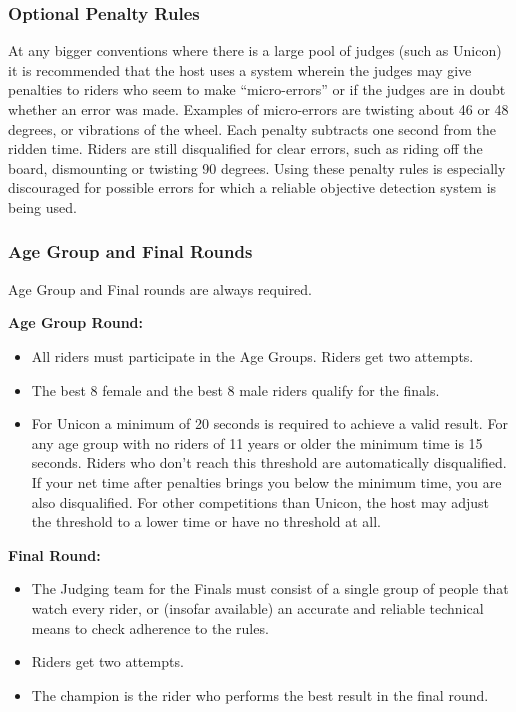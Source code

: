 \subsubsection{Optional Penalty Rules}
At any bigger conventions where there is a large pool of judges (such as Unicon) it is recommended that the host uses a system wherein the judges may give penalties to riders who seem to make ``micro-errors'' or if the judges are in doubt whether an error was made.
Examples of micro-errors are twisting about 46 or 48 degrees, or vibrations of the wheel.
Each penalty subtracts one second from the ridden time.
Riders are still disqualified for clear errors, such as riding off the board, dismounting or twisting 90 degrees.
Using these penalty rules is especially discouraged for possible errors for which a reliable objective detection system is being used.

\subsubsection{Age Group and Final Rounds}
Age Group and Final rounds are always required.

\textbf{Age Group Round:}
\begin{itemize}
\item All riders must participate in the Age Groups.
Riders get two attempts.
\item The best 8 female and the best 8 male riders qualify for the finals.
\item For Unicon a minimum of 20 seconds is required to achieve a valid result.
For any age group with no riders of 11 years or older the minimum time is 15 seconds.
Riders who don't reach this threshold are automatically disqualified.
If your net time after penalties brings you below the minimum time, you are also disqualified.
For other competitions than Unicon, the host may adjust the threshold to a lower time or have no threshold at all.
\end{itemize}

\textbf{Final Round:}
\begin{itemize}
\item The Judging team for the Finals must consist of a single group of people that watch every rider, or (insofar available) an accurate and reliable technical means to check adherence to the rules.
\item Riders get two attempts.
\item The champion is the rider who performs the best result in the final round.
\end{itemize}

